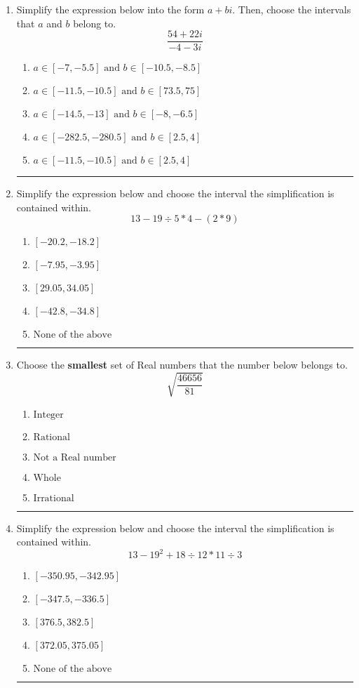 \documentclass[14pt]{extbook}
\newcommand{\litem}[1]{\item#1\hspace*{-1cm}\rule{\textwidth}{0.4pt}}
\begin{document}
\begin{enumerate}
{\begin{enumerate}[label=\Alph*.]
\end{enumerate} }
\litem{
Simplify the expression below into the form $a+bi$. Then, choose the intervals that $a$ and $b$ belong to.\[ \frac{54 + 22 i}{-4 - 3 i} \]\begin{enumerate}[label=\Alph*.]
\item \( a \in [-7, -5.5] \text{ and } b \in [-10.5, -8.5] \)
\item \( a \in [-11.5, -10.5] \text{ and } b \in [73.5, 75] \)
\item \( a \in [-14.5, -13] \text{ and } b \in [-8, -6.5] \)
\item \( a \in [-282.5, -280.5] \text{ and } b \in [2.5, 4] \)
\item \( a \in [-11.5, -10.5] \text{ and } b \in [2.5, 4] \)

\end{enumerate} }
\litem{
Simplify the expression below and choose the interval the simplification is contained within.\[ 13 - 19 \div 5 * 4 - (2 * 9) \]\begin{enumerate}[label=\Alph*.]
\item \( [-20.2, -18.2] \)
\item \( [-7.95, -3.95] \)
\item \( [29.05, 34.05] \)
\item \( [-42.8, -34.8] \)
\item \( \text{None of the above} \)

\end{enumerate} }
\litem{
Choose the \textbf{smallest} set of Real numbers that the number below belongs to.\[ \sqrt{\frac{46656}{81}} \]\begin{enumerate}[label=\Alph*.]
\item \( \text{Integer} \)
\item \( \text{Rational} \)
\item \( \text{Not a Real number} \)
\item \( \text{Whole} \)
\item \( \text{Irrational} \)

\end{enumerate} }
\litem{
Simplify the expression below and choose the interval the simplification is contained within.\[ 13 - 19^2 + 18 \div 12 * 11 \div 3 \]\begin{enumerate}[label=\Alph*.]
\item \( [-350.95, -342.95] \)
\item \( [-347.5, -336.5] \)
\item \( [376.5, 382.5] \)
\item \( [372.05, 375.05] \)
\item \( \text{None of the above} \)


\end{enumerate}}
\end{enumerate}
\end{document}
